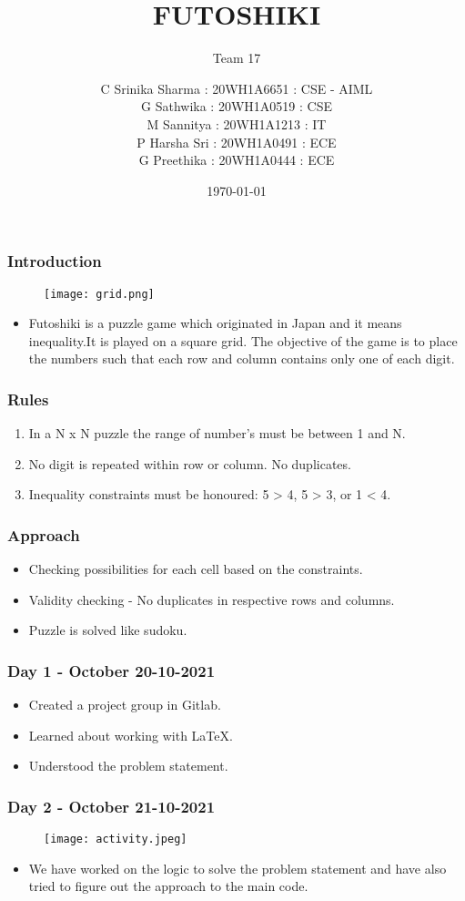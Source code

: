 \documentclass[14pt]{beamer}
\title{FUTOSHIKI}
\subtitle{Team 17}
\date{\today}
\author[Bvrith]{ C Srinika Sharma : 20WH1A6651 : CSE - AIML\\G Sathwika : 20WH1A0519 : CSE\\M Sannitya : 20WH1A1213 : IT \\P Harsha Sri : 20WH1A0491 : ECE\\G Preethika : 20WH1A0444 : ECE}
\begin{document}
   \begin{frame}
        \titlepage
    \end{frame}
   \begin{frame}
	\frametitle{Introduction}
        \begin{figure}
            \texttt{[image: grid.png]}
        \end{figure}
        \begin{itemize}
	    \item Futoshiki is a puzzle game which originated in Japan and it means inequality.It is played on a square grid. The objective of the game is to place the numbers such that each row and column contains only one of each digit.
	\end{itemize}
   \end{frame}
   \begin{frame}
	\frametitle{Rules}
         \begin{enumerate}
	    \item In a N x N puzzle the range of number's must be between 1 and N.  
	    \item No digit is repeated within row or column. No duplicates. 
	    \item Inequality constraints must be honoured: 5 > 4, 5 > 3, or 1 < 4.
	\end{enumerate}
  \end{frame}
\begin{frame}
   \frametitle{Approach}
   \begin{itemize}
       \item Checking possibilities for each cell based on the constraints.
       \item Validity checking - No duplicates in respective rows and columns.
       \item Puzzle is solved like sudoku.
   \end{itemize}
\end{frame}
 \begin{frame}
      \frametitle {Day 1 - October 20-10-2021}
     \begin{itemize}
          \item Created a project group in Gitlab.
          \item Learned about working with LaTeX.
          \item Understood the problem statement.
     \end{itemize}
\end{frame}
   \begin{frame}
	\frametitle{Day 2 - October 21-10-2021}
       \begin{figure}
            \texttt{[image: activity.jpeg]}
       \end{figure}
         \begin{itemize}
	    \item We have worked on the logic to solve the problem statement and have also tried to figure out the approach to the main code. 
	\end{itemize}
  \end{frame}
\end{document}
